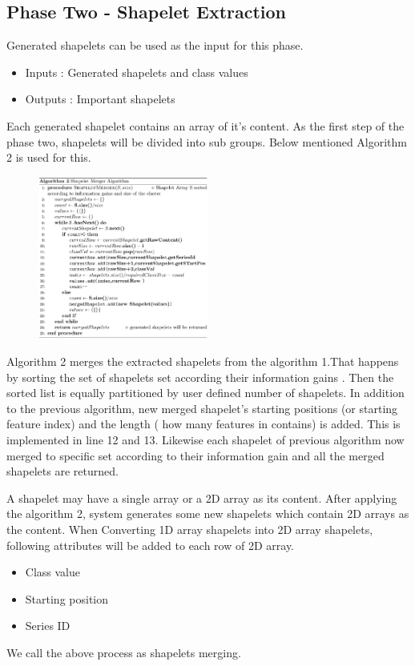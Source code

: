\documentclass[letterpaper, 10 pt, conference]{IEEEtran}  %
\begin{document}
\subsection{Phase Two - Shapelet Extraction}
Generated shapelets can be used as the input for this phase.
\begin{itemize}
\item Inputs : Generated shapelets and class values
\item Outputs : Important shapelets
\end{itemize}
Each generated shapelet contains an array of it’s content. As the first step of the phase two, shapelets will be divided into sub groups. Below mentioned Algorithm 2 is used for this.

\begin{figure}[h!]
\includegraphics[width=0.5\textwidth]{algo2.png}
\end{figure}

Algorithm 2 merges the extracted shapelets from the algorithm 1.That happens by sorting the set of shapelets set according their information gains . Then the sorted list is equally partitioned by user defined number of shapelets. In addition to the previous algorithm, new merged shapelet’s starting positions (or starting feature index) and the length ( how many features in contains) is added. This is implemented in line 12 and 13. Likewise each shapelet of previous algorithm now merged to specific set according to their information gain and all the merged shapelets are returned.

A shapelet may have a single array or a 2D array as its content. After applying the algorithm 2, system generates some new shapelets which contain 2D arrays as the content. When Converting 1D array shapelets into 2D array shapelets, following attributes will be added to each row of 2D array.
\begin{itemize}
\item Class value
\item Starting position
\item Series ID
\end{itemize}
We call the above process as shapelets merging.
\end{document}
